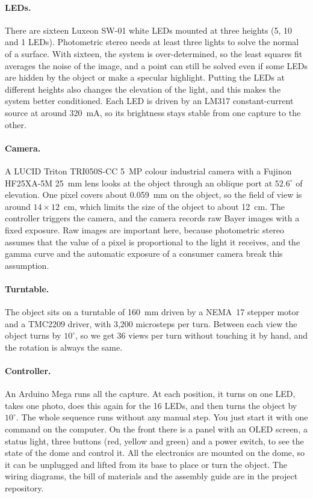 \documentclass[10pt,twocolumn]{article}
\begin{document}
\paragraph{LEDs.} There are sixteen Luxeon SW-01 white LEDs mounted at three heights (5, 10 and 1 LEDs). Photometric stereo needs at least three lights to solve the normal of a surface. With sixteen, the system is over-determined, so the least squares fit averages the noise of the image, and a point can still be solved even if some LEDs are hidden by the object or make a specular highlight. Putting the LEDs at different heights also changes the elevation of the light, and this makes the system better conditioned. Each LED is driven by an LM317 constant-current source at around 320~mA, so its brightness stays stable from one capture to the other.

\paragraph{Camera.} A LUCID Triton TRI050S-CC 5~MP colour industrial camera with a Fujinon HF25XA-5M 25~mm lens looks at the object through an oblique port at $52.6^\circ$ of elevation. One pixel covers about 0.059~mm on the object, so the field of view is around $14 \times 12$~cm, which limits the size of the object to about 12~cm. The controller triggers the camera, and the camera records raw Bayer images with a fixed exposure. Raw images are important here, because photometric stereo assumes that the value of a pixel is proportional to the light it receives, and the gamma curve and the automatic exposure of a consumer camera break this assumption.

\paragraph{Turntable.} The object sits on a turntable of 160~mm driven by a NEMA~17 stepper motor and a TMC2209 driver, with 3{,}200 microsteps per turn. Between each view the object turns by $10^\circ$, so we get 36 views per turn without touching it by hand, and the rotation is always the same.

\paragraph{Controller.} An Arduino Mega runs all the capture. At each position, it turns on one LED, takes one photo, does this again for the 16 LEDs, and then turns the object by $10^\circ$. The whole sequence runs without any manual step. You just start it with one command on the computer. On the front there is a panel with an OLED screen, a status light, three buttons (red, yellow and green) and a power switch, to see the state of the dome and control it. All the electronics are mounted on the dome, so it can be unplugged and lifted from its base to place or turn the object. The wiring diagrams, the bill of materials and the assembly guide are in the project repository.
\end{document}
